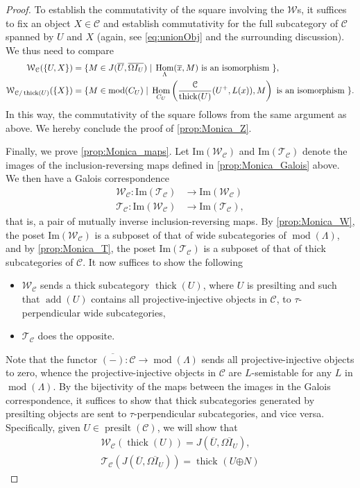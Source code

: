\documentclass[10pt,twoside, a4paper,reqno]{amsart}
\DeclareMathOperator{\mods}{mod}
\DeclareMathOperator{\presilt}{presilt}
\DeclareMathOperator{\Hom}{Hom}
\DeclareMathOperator{\add}{add}
\DeclareMathOperator{\thick}{thick}
\newcommand{\sth}{\;\vert\;}
\newcommand{\calC}{\mathcal{C}}
\newcommand{\calT}{\mathcal{T}}
\newcommand{\calW}{\mathcal{W}}
\theoremstyle{definition}
\begin{document}
\begin{proof}
To establish the commutativity of the square involving the $\calW$s, it suffices to fix an object $X\in \calC$ and establish commutativity for the full subcategory of $\calC$ spanned by $U$ and $X$ (again, see \eqref{eq:unionObj} and the surrounding discussion). We {thus need to compare}
      \begin{align*}
      \calW_{\calC}(\{U,X\}) &= \{M\in J(\overline{U},\overline{\Omega I_U}) \sth \Hom_{\Lambda}(\overline{x},M) \text{ is an isomorphism } \}, \\
      \calW_{\calC/\thick(U)}(\{X\}) &= \{M \in \mods(C_U) \sth \Hom_{C_U}\left({\calC\over \thick(U)}(U^+,{L(x)}), M \right) \text{ is an isomorphism } \}. 
      \end{align*}
       {In this way, t}he commutativity of the square follows from the same argument as above. We hereby conclude the proof of \eqref{prop:Monica_Z}.
       
        Finally, we prove \eqref{prop:Monica_maps}.
    Let $\mathrm{Im}(\calW_{\calC})$ and $\mathrm{Im}(\calT_{\calC})$ denote the images of the inclusion-reversing maps defined in \eqref{prop:Monica_Galois} above. We then have a {Galois correspondence} \cite[{Thm.} 2]{Ore44}
    \begin{align*}
        \calW_{\calC}: \mathrm{Im}(\calT_{\calC}) &\to \mathrm{Im}(\calW_{\calC}) \\
        \calT_{\calC}: \mathrm{Im}(\calW_{\calC}) &\to \mathrm{Im}(\calT_{\calC}),
    \end{align*}
    {that is,} a pair of mutually inverse inclusion-reversing maps.
     By \eqref{prop:Monica_W}, the poset $\mathrm{Im}(\calW_{\calC})$ is a subposet of that of wide subcategories of $\mods(\Lambda)$, and by \eqref{prop:Monica_T}, the poset $\mathrm{Im}(\calT_{\calC})$ is a subposet of that of thick subcategories of $\calC$.  
     It now suffices to show the { following}
     \begin{itemize}
     	\item $\calW_{\calC}$ sends a thick subcategory $\thick(U)$, where $U$ is {presilting and} {such that $\add(U)$ contains all projective-injective objects in $\calC$,} to $\tau$-perpendicular wide subcategories,
	\item $\calT_{\calC}$ does the opposite.
     \end{itemize}
     {Note that the functor $\overline{(-)}\colon \calC \to \mods(\Lambda)$ sends all projective-injective objects to zero, whence the projective-injective objects in $\calC$ are $L$-semistable for any $L$ in $\mods(\Lambda)$.}
     By the bijectivity of the maps {between the images} in the Galois correspondence, {it suffices to show that thick subcategories generated by presilting objects are sent to $\tau$-perpendicular subcategories, and vice versa}. Specifically, given  $U\in\presilt(\calC)$, we will show that
    \begin{align}
        \calW_{\calC}(\thick(U))=J(\overline{U},\overline{\Omega I_U}), \label{eq:Monica_WJ} 
        \\
         {\calT_{\calC}(J(\overline{U},\overline{\Omega I_U}))=\thick_{}(U {\oplus N})} \label{eq:Monica_Tt}
    \end{align}
    

\end{proof}
\end{document}
